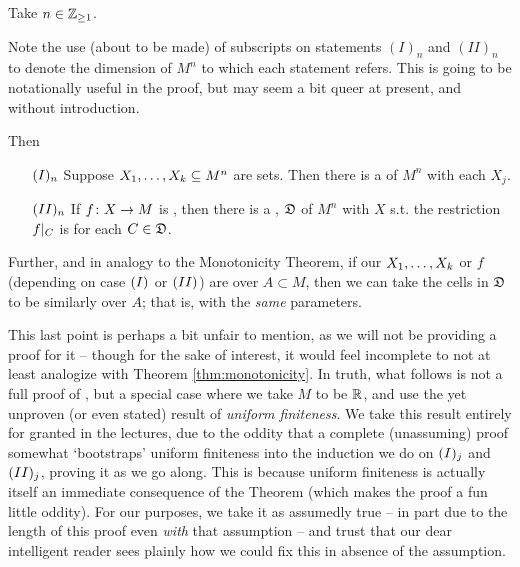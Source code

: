 \begin{theorem}[\CD]
  \label{thm:cell-decomposition}
  Take $n \in \Zgeq{1}$.
  \begin{svgraybox}
    Note the use (about to be made) of subscripts on statements $(I)_n$ and $(II)_n$ to denote the dimension of $M^n$ to which each statement refers. This is going to be notationally useful in the proof, but may seem a bit queer at present, and without introduction.
  \end{svgraybox}
 Then
  \begin{enumerate}[label={}]
    \item[$\In$ ] Suppose $\vonevm{X}{k} \subseteq M^n$ are  sets. Then there is a \cd of $M^n$ \cmptble with each $X_j$.
    \item[$\IIn$ ] If $\funcdom{f}{X}{M}$ is , then there is a \cd, $\fancyD$ of $M^n$ \cmptble with $X$ s.t. the restriction $\funcrestr{f}{C}$ is \cont for each $C \in \fancyD$.
  \end{enumerate}

  Further, and in analogy to the Monotonicity Theorem, if our $\vonevm{X}{k}$ or $f$ (depending on case $\In[]$ or $\IIn[]$) are  over $A \subset M$, then we can take the cells in  $\fancyD$ to be similarly  over $A$; that is, with the \emph{same} parameters.

  \begin{svgraybox}
    This last point is perhaps a bit unfair to mention, as we will not be providing a proof for it -- though for the sake of interest, it would feel incomplete to not at least analogize with Theorem \ref{thm:monotonicity}. In truth, what follows is not a full proof of \CD, but a special case where we take $M$ to be $\R$, and use the yet unproven (or even stated) result of \emph{uniform finiteness}. We take this result entirely for granted in the lectures, due to the oddity that a complete (unassuming) proof somewhat `bootstraps' uniform finiteness into the induction we do on $\In[j]$ and $\IIn[j]$, proving it as we go along. This is because uniform finiteness is actually itself an immediate consequence of the \CD Theorem (which makes the proof a fun little oddity). For our purposes, we take it as assumedly true -- in part due to the length of this proof even \emph{with} that assumption -- and trust that our dear intelligent reader sees plainly how we could fix this in absence of the assumption.
  \end{svgraybox}

\end{theorem}

